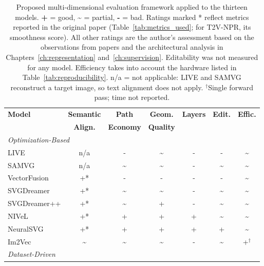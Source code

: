 \begin{table}[htbp]
\centering
\caption{Proposed multi-dimensional evaluation 
framework applied to the thirteen models. 
\textbf{+} = good, \textbf{\textasciitilde} = partial, 
\textbf{-} = bad. Ratings marked * reflect metrics 
reported in the original paper (Table~\ref{tab:metrics_used}; 
for T2V-NPR, its smoothness score). All other ratings are 
the author's assessment based on the observations from papers and
the architectural analysis in Chapters~\ref{ch:representation} 
and~\ref{ch:supervision}. Editability was not measured for any 
model. Efficiency takes into account the hardware listed in 
Table~\ref{tab:reproducibility}. n/a = not applicable: LIVE and SAMVG 
reconstruct a target image, so text alignment does not apply. 
$^\dagger$Single forward pass; time not reported.}
\label{tab:framework}
\small
\begin{tabularx}{\textwidth}{l c c c c c c}
\toprule
\textbf{Model} & \textbf{Semantic} & \textbf{Path} & 
\textbf{Geom.} & \textbf{Layers} & \textbf{Edit.} & 
\textbf{Effic.} \\
 & \textbf{Align.} & \textbf{Economy} & 
\textbf{Quality} & & & \\
\midrule
\multicolumn{7}{l}{\textit{Optimization-Based}} \\
\midrule
LIVE         & n/a             & -               & \textasciitilde  & - & -               & \textasciitilde \\
SAMVG        & n/a             & \textasciitilde & \textasciitilde  & - & \textasciitilde & \textasciitilde\\
VectorFusion & +*              & -               & -                & - & -               & \textasciitilde \\
SVGDreamer   & +*              & \textasciitilde & \textasciitilde  & - & \textasciitilde & \textasciitilde \\
SVGDreamer++ & +*              & \textasciitilde & +                & - & \textasciitilde & \textasciitilde \\
NIVeL        & +*              & +               & +                & + & \textasciitilde & \textasciitilde \\
NeuralSVG    & +*              & +               & +                & + & +               & \textasciitilde \\
Im2Vec       & \textasciitilde & \textasciitilde & \textasciitilde  & - & \textasciitilde & +$^\dagger$ \\
\midrule
\multicolumn{7}{l}{\textit{Dataset-Driven}} \\

\end{tabularx}
\end{table}
